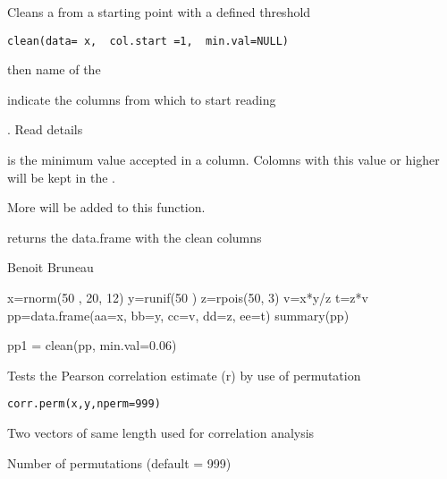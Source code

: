 \documentclass[a4paper]{book}
\begin{document}
%
\begin{Description}\relax
Cleans a  from a starting point with a defined threshold
\end{Description}
%
\begin{Usage}
\begin{verbatim}
clean(data= x,  col.start =1,  min.val=NULL)
\end{verbatim}
\end{Usage}
%
\begin{Arguments}
\begin{ldescription}
\item[\code{data}] then name of the 
\item[\code{col.start}] indicate the columns from which to start reading 
\item[\code{min.val}] . Read details
\end{ldescription}
\end{Arguments}
%
\begin{Details}\relax
{} is the minimum value accepted in a column. Colomns with this value or higher will be kept in the .

More will be added to this function.
\end{Details}
%
\begin{Value}
returns the data.frame with the clean columns
\end{Value}
%
\begin{Author}\relax
Benoit Bruneau
\end{Author}
%
\begin{Examples}
\begin{ExampleCode}
x=rnorm(50 , 20,  12)
y=runif(50 )
z=rpois(50,  3)
v=x*y/z
t=z*v
pp=data.frame(aa=x,  bb=y, cc=v,  dd=z,  ee=t)
summary(pp)

pp1 = clean(pp, min.val=0.06)
\end{ExampleCode}
\end{Examples}
\newpage
{}
%
\begin{Description}\relax
Tests the Pearson correlation estimate (r) by use of permutation
\end{Description}
%
\begin{Usage}
\begin{verbatim}
corr.perm(x,y,nperm=999)
\end{verbatim}
\end{Usage}
%
\begin{Arguments}
\begin{ldescription}
\item[\code{x,y}] Two vectors of same length used for correlation analysis
\item[\code{nperm}] Number of permutations (default = 999)
\end{ldescription}
\end{Arguments}
\end{document}
